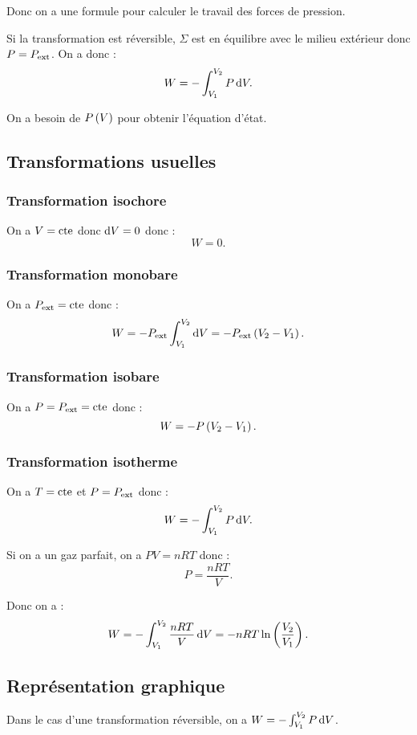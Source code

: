 Donc on a une formule pour calculer le travail des forces de pression.

Si la transformation est réversible, \(\Sigma\) est en équilibre avec le milieu extérieur donc \(P=P_{\mathrm{ext}}\). On a donc : \[W=-\int_{V_1}^{V_2}P\odif{V}.\]

On a besoin de \(P\left(V\right)\) pour obtenir l'équation d'état.

\subsection{Transformations usuelles}

\subsubsection{Transformation isochore}

On a \(V=\mathrm{cte}\) donc \(\odif{V}=0\) donc : \[W=0.\]

\subsubsection{Transformation monobare}

On a \(P_{\mathrm{ext}}=\mathrm{cte}\) donc : \[W=-P_\ext\int_{V_1}^{V_2}\odif{V}=-P_\ext\paren{V_2-V_1}.\]

\subsubsection{Transformation isobare}

On a \(P=P_{\mathrm{ext}}=\mathrm{cte}\) donc : \[W=-P\left(V_2-V_1\right).\]

\subsubsection{Transformation isotherme}

On a \(T=\mathrm{cte}\) et \(P=P_{\mathrm{ext}}\) donc : \[W=-\int_{V_1}^{V_2}P\odif{V}.\]

Si on a un gaz parfait, on a \(PV=nRT\) donc : \[P=\dfrac{nRT}{V}.\]

Donc on a : \[W=-\int_{V_1}^{V_2}\dfrac{nRT}{V}\odif{V}=-nRT\ln\paren{\dfrac{V_2}{V_1}}.\]

\subsection{Représentation graphique}

Dans le cas d'une transformation réversible, on a \(W=-\int_{V_1}^{V_2}P\odif{V}\).

